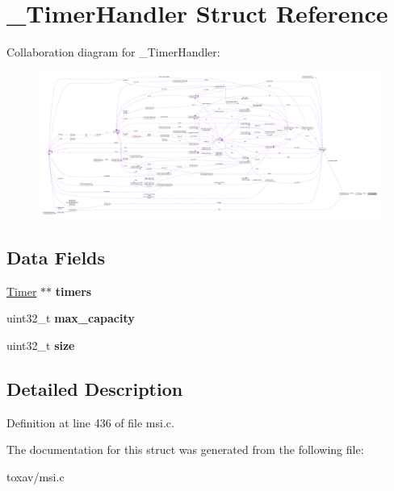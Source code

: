 \hypertarget{struct___timer_handler}{\section{\+\_\+\+Timer\+Handler Struct Reference}
\label{struct___timer_handler}
}


Collaboration diagram for \+\_\+\+Timer\+Handler\+:\nopagebreak
\begin{figure}[H]
\begin{center}
\leavevmode
\includegraphics[width=350pt]{struct___timer_handler__coll__graph}
\end{center}
\end{figure}
\subsection*{Data Fields}
\begin{DoxyCompactItemize}
\item 
\hypertarget{struct___timer_handler_af6a69553fb8462326147c121a4c3e98c}{\hyperlink{struct___timer}{Timer} $\ast$$\ast$ {\bfseries timers}}\label{struct___timer_handler_af6a69553fb8462326147c121a4c3e98c}

\item 
\hypertarget{struct___timer_handler_a75d656828e87eb82559cb02fa2219d98}{uint32\+\_\+t {\bfseries max\+\_\+capacity}}\label{struct___timer_handler_a75d656828e87eb82559cb02fa2219d98}

\item 
\hypertarget{struct___timer_handler_ab2c6b258f02add8fdf4cfc7c371dd772}{uint32\+\_\+t {\bfseries size}}\label{struct___timer_handler_ab2c6b258f02add8fdf4cfc7c371dd772}

\end{DoxyCompactItemize}


\subsection{Detailed Description}


Definition at line 436 of file msi.\+c.



The documentation for this struct was generated from the following file\+:\begin{DoxyCompactItemize}
\item 
toxav/msi.\+c\end{DoxyCompactItemize}

